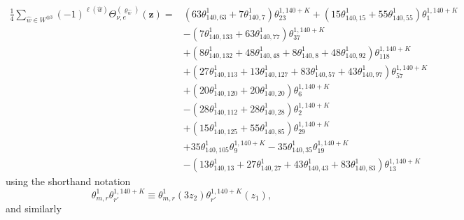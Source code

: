\documentclass[10pt,a4paper]{amsart}
\theoremstyle{definition}
\numberwithin{equation}{section}
\begin{document}
\begin{align}
\frac{1}{4}\sum_{\hat{w}\in W^{\otimes 3}}(-1)^{\ell(\hat{w})}\Theta^{(\varrho_{\hat{w}})}_{\nu,e}\left(\mathbf{z}\right)={}& {\left(63 \theta^{1}_{140,63} + 7 \theta^{1}_{140,7}\right)} \theta^{1,140+K}_{23}
+ {\left(15 \theta^{1}_{140,15} + 55 \theta^{1}_{140,55}\right)} \theta^{1,140+K}_{1} \nonumber\\
		&
- {\left( 7 \theta^{1}_{140,133} + 63 \theta^{1}_{140,77}\right)} \theta^{1,140+K}_{37}\nonumber\\
		&
	+ \left(8\theta^{1}_{140,132} + 48 \theta^{1}_{140,48} + 8\theta^{1}_{140,8} + 48 \theta^{1}_{140,92} \right) \theta^{1,140+K}_{118} \nonumber\\
	 &
+ \left(27 \theta^{1}_{140,113} + 13 \theta^{1}_{140,127} + 83 \theta^{1}_{140,57} + 43 \theta^{1}_{140,97} \right) \theta^{1,140+K}_{57}\nonumber\\
	&
+ {\left( 20 \theta^{1}_{140,120} + 20 \theta^{1}_{140,20}\right)} \theta^{1,140+K}_{6} \nonumber\\
	&
- \left( 28 \theta^{1}_{140,112} + 28 \theta^{1}_{140,28}\right) \theta^{1,140+K}_{2}\nonumber\\
	&
+ {\left(15 \theta^{1}_{140,125} + 55 \theta^{1}_{140,85}\right)} \theta^{1,140+K}_{29} \nonumber\\
	&
+ 35 \theta^{1}_{140,105} \theta^{1,140+K}_{9} - 35 \theta^{1}_{140,35} \theta^{1,140+K}_{19}\nonumber\\
	&
- \left(13 \theta^{1}_{140,13} + 27 \theta^{1}_{140,27} + 43 \theta^{1}_{140,43} + 83 \theta^{1}_{140,83}\right) \theta^{1,140+K}_{13}\!\!\!\label{eq:theta0_example1}
\end{align}
using the shorthand notation
\[
 \theta^{1}_{m,r} \theta^{1,140+K}_{r'}
\equiv
 \theta^{1}_{m,r} \left(3z_{2} \right)\theta^{1,140+K}_{r'}\left(z_{1} \right),
\]
and similarly
\end{document}
